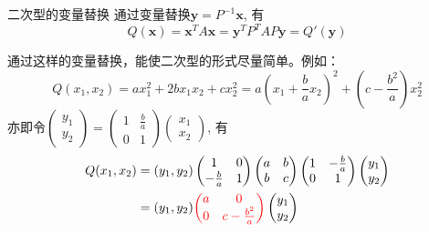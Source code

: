 \documentclass[10pt]{beamer}
\begin{document}

\begin{frame}

\begin{block}{二次型的变量替换}
通过变量替换$\mathbf{y} = P^{-1}\mathbf{x}$, 有
$$Q(\mathbf{x}) = \mathbf{x}^T A \mathbf{x} = \mathbf{y}^T P^TAP \mathbf{y} = Q'(\mathbf{y})$$

\pause

通过这样的变量替换，能使二次型的形式尽量简单。例如：
\begin{displaymath}
Q(x_1,x_2) = ax_1^2 + 2bx_1x_2 + cx_2^2 = a\left( x_1 + \dfrac{b}{a}x_2 \right)^2 + \left( c - \dfrac{b^2}{a} \right) x_2^2
\end{displaymath}
亦即令\(\displaystyle \begin{pmatrix} y_1 \\ y_2 \end{pmatrix} = \begin{pmatrix} 1 & \frac{b}{a} \\ 0 & 1 \end{pmatrix} \begin{pmatrix} x_1 \\ x_2 \end{pmatrix}\), 有
\begin{align*}
Q(x_1,x_2) & = (y_1,y_2) \begin{pmatrix} 1 & 0 \\ -\frac{b}{a} & 1 \end{pmatrix} \begin{pmatrix} a & b \\ b & c \end{pmatrix} \begin{pmatrix} 1 & -\frac{b}{a} \\ 0 & 1 \end{pmatrix} \begin{pmatrix} y_1 \\ y_2 \end{pmatrix} \\
& = (y_1,y_2) {\color{red} \begin{pmatrix} a & 0 \\ 0 & c - \frac{b^2}{a} \end{pmatrix}} \begin{pmatrix} y_1 \\ y_2 \end{pmatrix}
\end{align*}
\end{block}

\end{frame}
\end{document}
